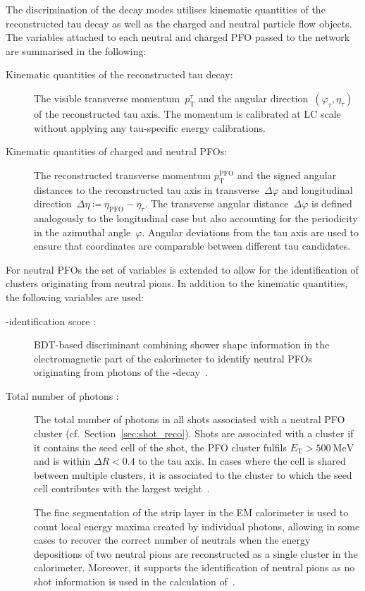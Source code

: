 The discrimination of the decay modes utilises kinematic quantities of the
reconstructed tau decay as well as the charged and neutral particle flow
objects. The variables attached to each neutral and charged PFO passed to the
network are summarised in the following:
\begin{description}
\item[Kinematic quantities of the reconstructed tau decay:] The visible
  transverse momentum~$p_\text{T}^\tau$ and the angular
  direction~$(\varphi_\tau, \eta_\tau)$ of the reconstructed tau axis. The
  momentum is calibrated at LC scale without applying any tau-specific energy
  calibrations.

\item[Kinematic quantities of charged and neutral PFOs:] The reconstructed
  transverse momentum $p_\text{T}^\text{PFO}$ and the signed angular distances
  to the reconstructed tau axis in transverse~$\Delta\varphi$ and longitudinal
  direction~$\Delta\eta \coloneqq \eta_\text{PFO} - \eta_\tau$. The transverse
  angular distance~$\Delta\varphi$ is defined analogously to the longitudinal
  case but also accounting for the periodicity in the azimuthal angle~$\varphi$.
  Angular deviations from the tau axis are used to ensure that coordinates are
  comparable between different tau candidates. 
\end{description}
For neutral PFOs the set of variables is extended to allow for the
identification of clusters originating from neutral pions. In addition to the
kinematic quantities, the following variables are used:
\begin{description}
\item[-identification score :]
  BDT-based discriminant combining shower shape information in the
  electromagnetic part of the calorimeter to identify neutral PFOs originating
  from photons of the -decay~\cite{atlas:taurec:decaymodes}.

\item[Total number of photons :] The total
  number of photons in all shots associated with a neutral PFO cluster (cf.\
  Section~\ref{sec:shot_reco}). Shots are associated with a cluster if it
  contains the seed cell of the shot, the PFO cluster fulfils
  $E_\text{T} > \SI{500}{\mega\electronvolt}$ and is within $\Delta R < 0.4$ to
  the tau axis. In cases where the cell is shared between multiple clusters, it
  is associated to the cluster to which the seed cell contributes with the
  largest weight~\cite{athena}.

  The fine segmentation of the strip layer in the EM calorimeter is used to
  count local energy maxima created by individual photons, allowing in some
  cases to recover the correct number of neutrals when the energy depositions of
  two neutral pions are reconstructed as a single cluster in the calorimeter.
  Moreover, it supports the identification of neutral pions as no shot
  information is used in the calculation of~.
\end{description}

